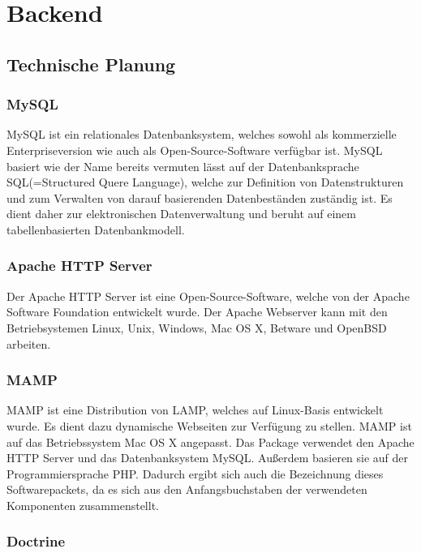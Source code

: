 \section{Backend}

  \subsection{Technische Planung}

    \subsubsection{MySQL}

	MySQL ist ein relationales Datenbanksystem, welches sowohl als kommerzielle Enterpriseversion wie auch als Open-Source-Software verfügbar ist. MySQL basiert wie der Name bereits vermuten lässt auf der Datenbanksprache SQL(=Structured Quere Language), welche zur Definition von Datenstrukturen und zum Verwalten von darauf basierenden Datenbeständen zuständig ist. Es dient daher zur elektronischen Datenverwaltung und beruht auf einem tabellenbasierten Datenbankmodell.

    \subsubsection{Apache HTTP Server}

	Der Apache HTTP Server ist eine Open-Source-Software, welche von der Apache Software Foundation entwickelt wurde. Der Apache Webserver kann mit den Betriebsystemen Linux, Unix, Windows, Mac OS X, Betware und OpenBSD arbeiten.

    \subsubsection{MAMP}

	MAMP ist eine Distribution von LAMP, welches auf Linux-Basis entwickelt wurde. Es dient dazu dynamische Webseiten zur Verfügung zu stellen. MAMP ist auf das Betriebssystem Mac OS X angepasst. Das Package verwendet den Apache HTTP Server und das Datenbanksystem MySQL. Außerdem basieren sie auf der Programmiersprache PHP. Dadurch ergibt sich auch die Bezeichnung dieses Softwarepackets, da es sich aus den Anfangsbuchstaben der verwendeten Komponenten zusammenstellt.

    \subsubsection{Doctrine}

